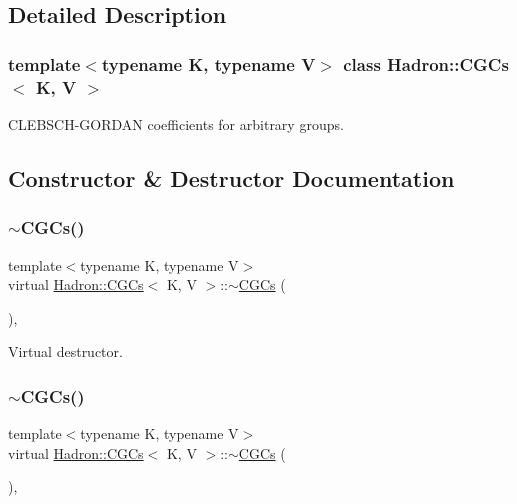 \subsection{Detailed Description}
\subsubsection*{template$<$typename K, typename V$>$\newline
class Hadron\+::\+C\+G\+Cs$<$ K, V $>$}

C\+L\+E\+B\+S\+C\+H-\/\+G\+O\+R\+D\+AN coefficients for arbitrary groups. 

\subsection{Constructor \& Destructor Documentation}
\mbox{\label{classHadron_1_1CGCs_a882c1ea3451254725b9d86c598d6c29a}} 
\subsubsection{\texorpdfstring{$\sim$CGCs()}{~CGCs()}\hspace{0.1cm}{\footnotesize\ttfamily [1/2]}}
{\footnotesize\ttfamily template$<$typename K, typename V$>$ \\
virtual \mbox{\hyperlink{classHadron_1_1CGCs}{Hadron\+::\+C\+G\+Cs}}$<$ K, V $>$\+::$\sim$\mbox{\hyperlink{classHadron_1_1CGCs}{C\+G\+Cs}} (\begin{DoxyParamCaption}{ }\end{DoxyParamCaption})\hspace{0.3cm}{\ttfamily [inline]}, {\ttfamily [virtual]}}



Virtual destructor. 

\mbox{\label{classHadron_1_1CGCs_a882c1ea3451254725b9d86c598d6c29a}} 
\subsubsection{\texorpdfstring{$\sim$CGCs()}{~CGCs()}\hspace{0.1cm}{\footnotesize\ttfamily [2/2]}}
{\footnotesize\ttfamily template$<$typename K, typename V$>$ \\
virtual \mbox{\hyperlink{classHadron_1_1CGCs}{Hadron\+::\+C\+G\+Cs}}$<$ K, V $>$\+::$\sim$\mbox{\hyperlink{classHadron_1_1CGCs}{C\+G\+Cs}} (\begin{DoxyParamCaption}{ }\end{DoxyParamCaption})\hspace{0.3cm}{\ttfamily [inline]}, {\ttfamily [virtual]}}



